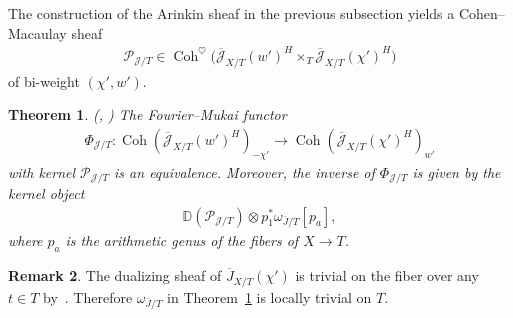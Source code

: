 \documentclass[11pt,oneside,a4paper,mathscr]{amsart}
\newtheorem{thm}{Theorem}[section]
\theoremstyle{definition}
\newtheorem{remark}[thm]{Remark}
\newcommand{\cP}{\mathcal{P}}
\newcommand{\Coh}{\operatorname{Coh}}
\begin{document}
The construction of the Arinkin sheaf in the previous subsection yields a Cohen--Macaulay sheaf
\begin{align*}
    \cP_{\mathcal{J}/T} \in
    \Coh^{\heartsuit}\bigl(
    \overline{\mathcal{J}}_{X/T}(w')^H
    \times_T
    \overline{\mathcal{J}}_{X/T}(\chi')^H
    \bigr)
\end{align*}
of bi-weight $(\chi',w')$.

\begin{thm}\label{thm:MRV}\emph{(\cite[Theorem~A]{MRVF2}, \cite[Proposition~2.28]{TodaGL2})}
The Fourier--Mukai functor
\begin{align}\label{Phi:J}
\Phi_{\mathcal{J}/T} \colon
\Coh(\overline{\mathcal{J}}_{X/T}(w')^H)_{-\chi'}
\to
\Coh(\overline{\mathcal{J}}_{X/T}(\chi')^H)_{w'}
\end{align}
with kernel $\cP_{\mathcal{J}/T}$ is an equivalence. Moreover, the inverse of 
$\Phi_{\mathcal{J}/T}$ is given by the kernel object
\begin{align}\label{kernel:inv}
\mathbb{D}(\cP_{\mathcal{J}/T})\otimes p_1^*\omega_{\overline{J}/T}[p_a],
\end{align}
where $p_a$ is the arithmetic genus of the fibers of $X\to T$.
\end{thm}

\begin{remark}\label{rmk:dualizing}
    The dualizing sheaf of $\overline{J}_{X/T}(\chi')$ is trivial 
    on the fiber over any $t\in T$ by~\cite[Theorem~A]{MRF3}. 
    Therefore $\omega_{\overline{J}/T}$ in Theorem~\ref{thm:MRV} is locally trivial on $T$.
\end{remark}
\end{document}
